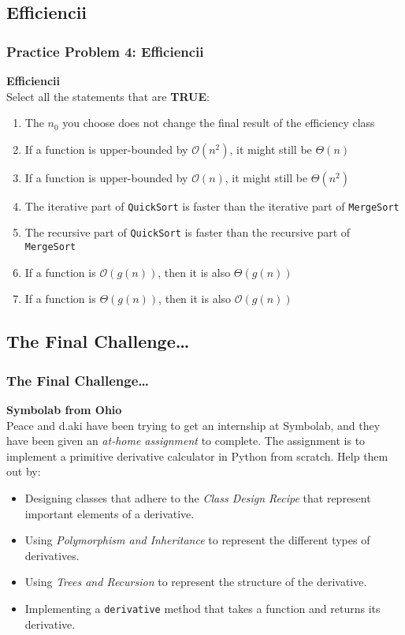 \documentclass[hyperref={colorlinks,citecolor=blue,linkcolor=blue,urlcolor=blue}, aspectratio=1610]{beamer}
\begin{document}
\subsection{Efficiencii}
\begin{frame}
  \frametitle{Practice Problem 4: Efficiencii}
  \textbf{Efficiencii}\\
  Select all the statements that are \textbf{TRUE}:
  \begin{enumerate}
    \item The $n_0$ you choose does not change the final result of the efficiency class
    \item If a function is upper-bounded by $\mathcal{O}(n^2)$, it might still be $\Theta(n)$
    \item If a function is upper-bounded by $\mathcal{O}(n)$, it might still be $\Theta(n^2)$
    \item The iterative part of \texttt{QuickSort} is faster than the iterative part of \texttt{MergeSort}
    \item The recursive part of \texttt{QuickSort} is faster than the recursive part of \texttt{MergeSort}
    \item If a function is $\mathcal{O}(g(n))$, then it is also $\Theta(g(n))$
    \item If a function is $\Theta(g(n))$, then it is also $\mathcal{O}(g(n))$
\end{enumerate}
\end{frame}

\subsection{The Final Challenge\ldots}
\begin{frame}
  \frametitle{The Final Challenge\ldots}
  \textbf{Symbolab from Ohio}\\
  Peace and d.aki have been trying to get an internship at Symbolab, and they have been given an \textit{at-home assignment} to complete. The assignment is to implement a primitive derivative calculator in Python from scratch. Help them out by:
  \begin{itemize}
    \item Designing classes that adhere to the \textit{Class Design Recipe} that represent important elements of a derivative.
    \item Using \textit{Polymorphism and Inheritance} to represent the different types of derivatives.
    \item Using \textit{Trees and Recursion} to represent the structure of the derivative.
    \item Implementing a \texttt{derivative} method that takes a function and returns its derivative.
  \end{itemize}
\end{frame}
\end{document}
